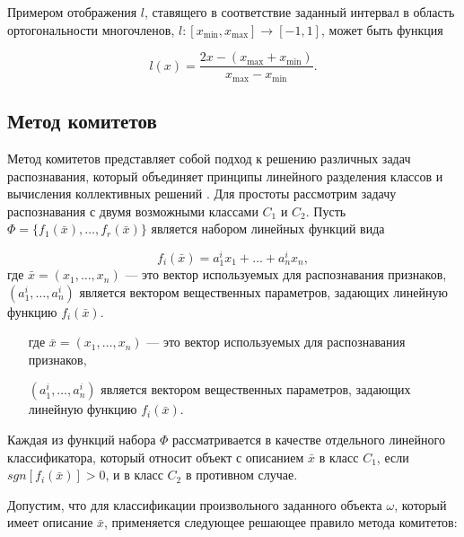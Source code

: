 Примером отображения $l$, ставящего в соответствие заданный интервал в область ортогональности многочленов, $l: [x_{\min}, x_{\max}] \rightarrow [-1, 1]$, может быть функция

\begin{equation}
l (x) = \frac{2x - (x_{\max} + x_{\min})}{x_{\max} - x_{\min}}.
\end{equation}


\subsection{Метод комитетов} \label{sect1_4_6}

Метод комитетов представляет собой подход к решению различных задач распознавания, который объединяет принципы линейного разделения классов и вычисления коллективных решений \cite{senko}.
Для простоты рассмотрим задачу распознавания с двумя возможными классами $C_1$ и $C_2$.
Пусть $\Phi = \{f_1(\bar{x}), \dots, f_r(\bar{x})\}$ является набором линейных функций вида

\begin{equation}
f_i(\bar{x}) = a_1^i x_1 + \dots + a_n^i x_n,
\end{equation}
где $\bar{x} = (x_1, \dots, x_n)$ --- это вектор используемых для распознавания признаков, $(a_1^i, \dots, a_n^i)$ является вектором вещественных параметров, задающих линейную функцию $f_i(\bar{x})$.
\begin{itemize}[align=left,leftmargin=1.8em,itemindent=0pt,labelsep=0pt,labelwidth=1.8em]
	\item[где] $\bar{x} = (x_1, \dots, x_n)$ --- это вектор используемых для распознавания признаков,
	\item[] $(a_1^i, \dots, a_n^i)$ является вектором вещественных параметров, задающих линейную функцию $f_i(\bar{x})$.
\end{itemize}

Каждая из функций набора $\Phi$ рассматривается в качестве отдельного линейного классификатора, который относит объект с описанием $\bar{x}$ в класс $C_1$, если $sgn [f_i(\bar{x})] > 0$, и в класс $C_2$ в противном случае.

Допустим, что для классификации произвольного заданного объекта $\omega$, который имеет описание $\bar{x}$, применяется следующее решающее правило метода комитетов:

